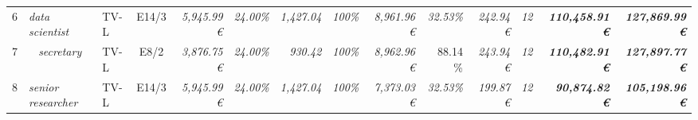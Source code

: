 \begin{table}[]
\begin{tabular}{clllcrrrrrrrrrr}
6                                                                                       & \multicolumn{2}{l}{\cellcolor[HTML]{FFFF99}\textit{data scientist}}                   & \cellcolor[HTML]{FFFF99}TV-L      & \cellcolor[HTML]{FFFF99}E14/3                & \cellcolor[HTML]{FFFF99}\textit{5,945.99 €}         & \textit{24.00\%}                                      & \textit{1,427.04}                            & \cellcolor[HTML]{FFFF99}\textit{100\%}                  & \cellcolor[HTML]{92D050}\textit{8,961.96 €}  & \cellcolor[HTML]{FFFF99}\textit{32.53\%}       & \cellcolor[HTML]{92D050}\textit{242.94 €}    & \cellcolor[HTML]{FFFF99}\textit{12}          & \cellcolor[HTML]{BFBFBF}\textit{\textbf{110,458.91 €}}          & \textit{\textbf{127,869.99 €}}                                                                \\
7                                                                                       & \multicolumn{2}{c}{\cellcolor[HTML]{FFFF99}\textit{secretary}}                        & \cellcolor[HTML]{FFFF99}TV-L      & \cellcolor[HTML]{FFFF99}E8/2                 & \cellcolor[HTML]{FFFF99}\textit{3,876.75 €}         & \textit{24.00\%}                                      & \textit{930.42}                              & \cellcolor[HTML]{FFFF99}\textit{100\%}                  & \cellcolor[HTML]{92D050}\textit{8,962.96 €}  & 88.14 \%                                       & \cellcolor[HTML]{92D050}\textit{243.94 €}    & \cellcolor[HTML]{FFFF99}\textit{12}          & \cellcolor[HTML]{BFBFBF}\textit{\textbf{110,482.91 €}}          & \textit{\textbf{127,897.77 €}}                                                                \\
8                                                                                       & \multicolumn{2}{l}{\cellcolor[HTML]{FFFF99}\textit{senior researcher}}                & \cellcolor[HTML]{FFFF99}TV-L      & \cellcolor[HTML]{FFFF99}E14/3                & \cellcolor[HTML]{FFFF99}\textit{5,945.99 €}         & \textit{24.00\%}                                      & \textit{1,427.04}                            & \cellcolor[HTML]{FFFF99}\textit{100\%}                  & \cellcolor[HTML]{92D050}\textit{7,373.03 €}  & \cellcolor[HTML]{FFFF99}\textit{32.53\%}       & \cellcolor[HTML]{92D050}\textit{199.87 €}    & \cellcolor[HTML]{FFFF99}\textit{12}          & \cellcolor[HTML]{BFBFBF}\textit{\textbf{90,874.82 €}}           & \textit{\textbf{105,198.96 €}}                                                                \\

\end{tabular}
\end{table}
